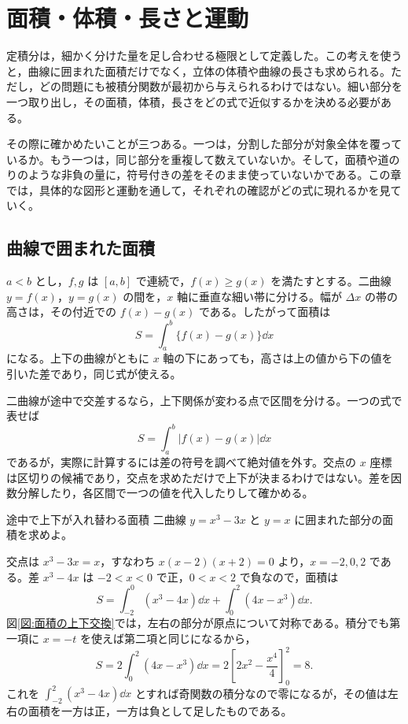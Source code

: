 \chapter{面積・体積・長さと運動}\label{章:積分の応用}

定積分は，細かく分けた量を足し合わせる極限として定義した。この考えを使うと，曲線に囲まれた面積だけでなく，立体の体積や曲線の長さも求められる。ただし，どの問題にも被積分関数が最初から与えられるわけではない。細い部分を一つ取り出し，その面積，体積，長さをどの式で近似するかを決める必要がある。

その際に確かめたいことが三つある。一つは，分割した部分が対象全体を覆っているか。もう一つは，同じ部分を重複して数えていないか。そして，面積や道のりのような非負の量に，符号付きの差をそのまま使っていないかである。この章では，具体的な図形と運動を通して，それぞれの確認がどの式に現れるかを見ていく。

\section{曲線で囲まれた面積}\label{節:曲線間の面積}

$a<b$ とし，$f,g$ は $[a,b]$ で連続で，$f(x)\geq g(x)$ を満たすとする。二曲線 $y=f(x)$，$y=g(x)$ の間を，$x$ 軸に垂直な細い帯に分ける。幅が $\Delta x$ の帯の高さは，その付近での $f(x)-g(x)$ である。したがって面積は
\begin{equation}\label{式:上下の差の面積}
S=\int_a^b\{f(x)-g(x)\}\dd x
\end{equation}
になる。上下の曲線がともに $x$ 軸の下にあっても，高さは上の値から下の値を引いた差であり，同じ式が使える。

二曲線が途中で交差するなら，上下関係が変わる点で区間を分ける。一つの式で表せば
\[
S=\int_a^b|f(x)-g(x)|\dd x
\]
であるが，実際に計算するには差の符号を調べて絶対値を外す。交点の $x$ 座標は区切りの候補であり，交点を求めただけで上下が決まるわけではない。差を因数分解したり，各区間で一つの値を代入したりして確かめる。

\begin{example}{途中で上下が入れ替わる面積}
二曲線 $y=x^3-3x$ と $y=x$ に囲まれた部分の面積を求めよ。
\end{example}

交点は $x^3-3x=x$，すなわち $x(x-2)(x+2)=0$ より，$x=-2,0,2$ である。差 $x^3-4x$ は $-2<x<0$ で正，$0<x<2$ で負なので，面積は
\[
S=\int_{-2}^0(x^3-4x)\dd x
 +\int_0^2(4x-x^3)\dd x.
\]
図\ref{図:面積の上下交換}では，左右の部分が原点について対称である。積分でも第一項に $x=-t$ を使えば第二項と同じになるから，
\[
S=2\int_0^2(4x-x^3)\dd x
 =2\left[2x^2-\frac{x^4}{4}\right]_0^2=8.
\]
これを $\int_{-2}^2(x^3-4x)\dd x$ とすれば奇関数の積分なので零になるが，その値は左右の面積を一方は正，一方は負として足したものである。

